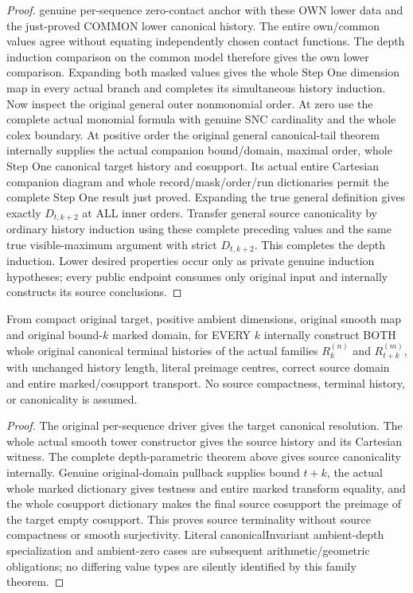 \begin{proof}
genuine per-sequence zero-contact anchor with these OWN lower data and the
just-proved COMMON lower canonical history. The entire own/common values
agree without equating independently chosen contact functions. The depth
induction comparison on the common model therefore gives the own lower
comparison. Expanding both masked values gives the whole Step One dimension
map in every actual branch and completes its simultaneous history induction.
Now inspect the original general outer nonmonomial order. At zero use the
complete actual monomial formula with genuine SNC cardinality and the whole
colex boundary. At positive order the original general canonical-tail theorem
internally supplies the actual companion bound/domain, maximal order, whole
Step One canonical target history and cosupport. Its actual entire Cartesian
companion diagram and whole record/mask/order/run dictionaries permit the
complete Step One result just proved. Expanding the true general definition
gives exactly $D_{t,k+2}$ at ALL inner orders. Transfer general source
canonicality by ordinary history induction using these complete preceding
values and the same true visible-maximum argument with strict $D_{t,k+2}$.
This completes the depth induction. Lower desired properties occur only as
private genuine induction hypotheses; every public endpoint consumes only
original input and internally constructs its source conclusions.
\end{proof}

\begin{theorem}
\label{hir:smooth-original-recursive-family-terminal-constructor}
\leanok
{}
From compact original target, positive ambient dimensions, original smooth
map and original bound-$k$ marked domain, for EVERY $k$ internally construct
BOTH whole original canonical terminal histories of the actual families
$R^{(n)}_k$ and $R^{(m)}_{t+k}$, with unchanged history length, literal
preimage centres, correct source domain and entire marked/cosupport transport.
No source compactness, terminal history, or canonicality is assumed.
\end{theorem}
\begin{proof}
The original per-sequence driver gives the target canonical resolution.
The whole actual smooth tower constructor gives the source history and its
Cartesian witness. The complete depth-parametric theorem above gives source
canonicality internally. Genuine original-domain pullback supplies bound
$t+k$, the actual whole marked dictionary gives testness and entire marked
transform equality, and the whole cosupport dictionary makes the final
source cosupport the preimage of the target empty cosupport. This proves
source terminality without source compactness or smooth surjectivity.
Literal canonicalInvariant ambient-depth specialization and ambient-zero
cases are subsequent arithmetic/geometric obligations; no differing value
types are silently identified by this family theorem.
\end{proof}
